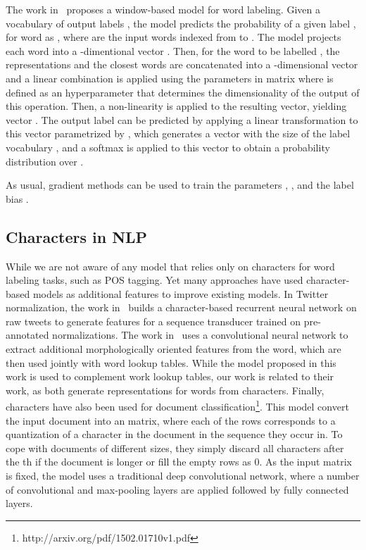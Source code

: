 \documentclass[11pt]{article}
\begin{document}
\begin{CJK*}{UTF8}{gbsn}
{The work in~\cite{collobert2011natural} proposes a window-based model for word labeling. Given a vocabulary of output labels , the model predicts the probability of a given label , for word  as , where  are the input words indexed from  to . The model projects each word  into a -dimentional vector . Then, for the word to be labelled , the representations  and the  closest words  are concatenated into a -dimensional vector and a linear combination is applied using the parameters in matrix  where  is defined as an hyperparameter that determines the dimensionality of the output of this operation. Then, a non-linearity is applied to the resulting vector, yielding vector . The output label can be predicted by applying a linear transformation to this vector parametrized by , which generates a vector with the size of the label vocabulary , and a softmax is applied to this vector to obtain a probability distribution over . 



As usual, gradient methods can be used to train the parameters , ,  and the label bias . 

\subsection{Characters in NLP}
While we are not aware of any model that relies only on characters for word labeling tasks, such as POS tagging. Yet many approaches have used character-based models as additional features to improve existing models. In Twitter normalization, the work in~\cite{chrupala2014normalizing} builds a character-based recurrent neural network on raw tweets to generate features for a sequence transducer trained on pre-annotated normalizations. The work in~\cite{icml2014c2_santos14} uses a convolutional neural network to extract additional morphologically oriented features from the word, which are then used jointly with word lookup tables. While the model proposed in this work is used to complement work lookup tables, our work is related to their work, as both generate representations for words from characters. Finally, characters have also been used for document classification\footnote{http://arxiv.org/pdf/1502.01710v1.pdf}. This model convert the input document into an  matrix, where each of the  rows corresponds to a quantization of a character in the document in the sequence they occur in. To cope with documents of different sizes, they simply discard all characters after the th if the document is longer or fill the empty rows as 0. As the input matrix is fixed, the model uses a traditional deep convolutional network, where a number of convolutional and max-pooling layers are applied followed by fully connected layers. 



}
\end{CJK*}
\end{document}
